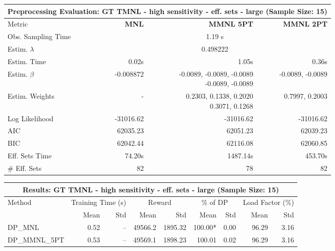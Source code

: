 
\begin{samepage}
\begin{center}
  \small
  \begin{tabular}{l|r|r|r}
    \toprule
    \multicolumn{4}{c}{\textbf{Preprocessing Evaluation: GT TMNL - high sensitivity - eff. sets - large (Sample Size: 15)}} \\
    \midrule
    Metric & \textbf{MNL} & \textbf{MMNL 5PT} & \textbf{MMNL 2PT} \\
    \midrule
    Obs. Sampling Time & \multicolumn{3}{c}{1.19 s} \\
    Estim. $\lambda$ & \multicolumn{3}{c}{0.498222} \\
    Estim. Time & 0.02s & 1.05s & 0.36s \\
    Estim. $\beta$ & -0.008872 & \makecell[tr]{-0.0089, -0.0089, -0.0089 \\ -0.0089, -0.0089} & -0.0089, -0.0089 \\
    Estim. Weights & - & \makecell[tr]{0.2303, 0.1338, 0.2020 \\ 0.3071, 0.1268} & 0.7997, 0.2003 \\
    Log Likelihood & -31016.62 & -31016.62 & -31016.62 \\
    AIC & 62035.23 & 62051.23 & 62039.23 \\
    BIC & 62042.44 & 62116.08 & 62060.85 \\
    Eff. Sets Time & 74.20s & 1487.14s & 453.70s \\
    \# Eff. Sets & 82 & 78 & 82 \\
    \bottomrule
  \end{tabular}
\end{center}
\begin{center}
  \small
  \begin{tabular}{l|rr|rr|rr|rr}
    \toprule
    \multicolumn{9}{c}{\textbf{Results: GT TMNL - high sensitivity - eff. sets - large (Sample Size: 15)}} \\
    \midrule
    Method & \multicolumn{2}{c|}{Training Time (s)} & \multicolumn{2}{c|}{Reward} & \multicolumn{2}{c|}{\% of DP} & \multicolumn{2}{c}{Load Factor (\%)} \\
    & Mean & Std & Mean & Std & Mean & Std & Mean & Std \\
    \midrule
    DP\_MNL      &     0.52 &    -- &    49566.2 &    1895.32 & 100.00* &    0.00 &   96.29 &    3.16 \\
    DP\_MMNL\_5PT &     0.53 &    -- &    49569.1 &    1898.23 &  100.01 &    0.02 &   96.29 &    3.16 \\

\end{tabular}
\end{center}
\end{samepage}
